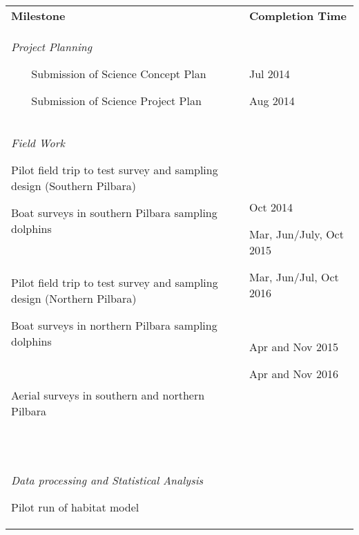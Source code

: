 \documentclass[version=last,
    paper=a4,                               %
    10pt,                                   %
    dvipsnames,
    oneside,                              %
    headings=openany,                       %
    open=any,
    BCOR=7mm,                               %
    DIV=15,     %
]{scrbook}
\begin{document}
\begin{longtable}[]{@{}ll@{}}
\toprule
\endhead
\begin{minipage}[t]{0.47\columnwidth}\raggedright
\textbf{Milestone}\strut
\end{minipage} & \begin{minipage}[t]{0.47\columnwidth}\raggedright
\textbf{Completion Time}\strut
\end{minipage}\tabularnewline
\begin{minipage}[t]{0.47\columnwidth}\raggedright
\emph{Project Planning}

~~~ Submission of Science Concept Plan

~~~ Submission of Science Project Plan\strut
\end{minipage} & \begin{minipage}[t]{0.47\columnwidth}\raggedright
~

Jul 2014

Aug 2014\strut
\end{minipage}\tabularnewline
\begin{minipage}[t]{0.47\columnwidth}\raggedright
\emph{Field Work}

Pilot field trip to test survey and sampling design (Southern Pilbara)

Boat surveys in southern Pilbara sampling dolphins

~

Pilot field trip to test survey and sampling design (Northern Pilbara)

Boat surveys in northern Pilbara sampling dolphins

~

Aerial surveys in southern and northern Pilbara

~\strut
\end{minipage} & \begin{minipage}[t]{0.47\columnwidth}\raggedright
~

Oct 2014

Mar, Jun/July, Oct 2015

Mar, Jun/Jul, Oct 2016

~

Apr and Nov 2015

Apr and Nov 2016

~\strut
\end{minipage}\tabularnewline
\begin{minipage}[t]{0.47\columnwidth}\raggedright
\emph{Data processing and Statistical Analysis}

Pilot run of habitat model


\end{minipage}
\end{longtable}
\end{document}
